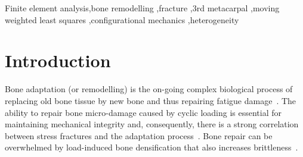 \documentclass[review]{elsarticle}
\numberwithin{equation}{section}
\begin{document}
\begin{frontmatter}

\begin{keyword}	
Finite element analysis\sep bone remodelling \sep fracture \sep 3rd metacarpal \sep moving weighted least squares \sep configurational mechanics \sep heterogeneity
\end{keyword}
%
\end{frontmatter}

\linenumbers

\section{Introduction}
Bone adaptation (or remodelling) is the on-going complex biological process of replacing old bone tissue by new bone and thus repairing fatigue damage~\citep{hughes2017role}.
The ability to repair bone micro-damage caused by cyclic loading is essential for maintaining mechanical integrity and, consequently, there is a strong correlation between stress fractures and the adaptation process~\citep{hughes2017role}. Bone repair can be overwhelmed by load-induced bone densification that also increases brittleness~\citep{loughridge2017qualitative}.
\end{document}
